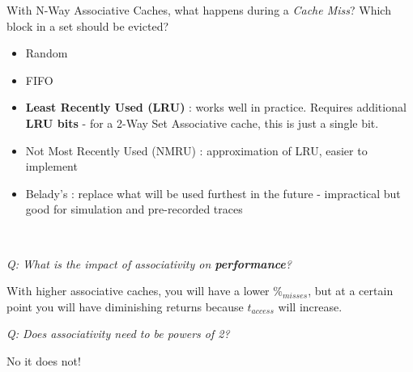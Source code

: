\documentclass[12pt]{article}
\newenvironment{QandA}{\begin{enumerate}[label=\bfseries\arabic*.]\bfseries}
                      {\end{enumerate}}
\newenvironment{answered}{\par\quad\normalfont}{}
\begin{document}
\begin{QandA}
\begin{answered}
With N-Way Associative Caches, what happens during a \textit{Cache Miss}? Which block in a set should be evicted?
\begin{itemize}
    \item Random
    \item FIFO
    \item \textbf{Least Recently Used (LRU)} : works well in practice. Requires additional \textbf{LRU bits} - for a 2-Way Set Associative cache, this is just a single bit.
    \item Not Most Recently Used (NMRU) : approximation of LRU, easier to implement
    \item Belady's : replace what will be used furthest in the future - impractical but good for simulation and pre-recorded traces 
\end{itemize}

\ 

\textit{Q: What is the impact of associativity on \textbf{performance}?}

\quad With higher associative caches, you will have a lower $\%_{misses}$, but at a certain point you will have diminishing returns because $t_{access}$ will increase. 

\textit{Q: Does associativity need to be powers of 2?}

\quad No it does not!

\end{answered}

\end{QandA}
\end{document}
